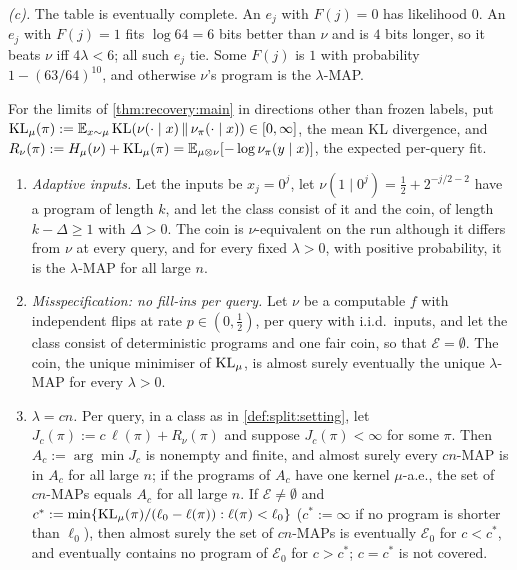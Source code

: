 \emph{(c).} The table is eventually complete. An $e_j$ with $F(j)=0$ has likelihood $0$. An $e_j$ with $F(j)=1$ fits $\log64=6$ bits better than $\nu$ and is $4$ bits longer, so it beats $\nu$ iff $4\lambda<6$; all such $e_j$ tie. Some $F(j)$ is $1$ with probability $1-(63/64)^{10}$, and otherwise $\nu$'s program is the $\lambda$-MAP.

For the limits of \cref{thm:recovery:main} in directions other than frozen labels, put $\operatorname{KL}_\mu(\pi):=\mathbb{E}_{x\sim\mu}\operatorname{KL}(\nu(\cdot\mid x)\,\Vert\,\nu_\pi(\cdot\mid x))\in[0,\infty]$, the mean KL divergence, and $R_\nu(\pi):=H_\mu(\nu)+\operatorname{KL}_\mu(\pi)=\mathbb{E}_{\mu\otimes\nu}[-\log\nu_\pi(y\mid x)]$, the expected per-query fit.

\begin{proposition}[Adaptive inputs, misspecification, $\lambda=cn$]\label{prop:recovery:beyond}
\begin{enumerate}[label=(\alph*),itemsep=1pt,topsep=2pt]
\item \emph{Adaptive inputs.} Let the inputs be $x_j=0^j$, let $\nu(1\mid0^j)=\frac12+2^{-j/2-2}$ have a program of length $k$, and let the class consist of it and the coin, of length $k-\Delta\ge1$ with $\Delta>0$. The coin is $\nu$-equivalent on the run although it differs from $\nu$ at every query, and for every fixed $\lambda>0$, with positive probability, it is the $\lambda$-MAP for all large $n$.
\item \emph{Misspecification: no fill-ins per query.} Let $\nu$ be a computable $f$ with independent flips at rate $p\in(0,\frac12)$, per query with i.i.d.\ inputs, and let the class consist of deterministic programs and one fair coin, so that $\mathcal E=\emptyset$. The coin, the unique minimiser of $\operatorname{KL}_\mu$, is almost surely eventually the unique $\lambda$-MAP for every $\lambda>0$.
\item \emph{$\lambda=cn$.} Per query, in a class as in \cref{def:split:setting}, let $J_c(\pi):=c\,\ell(\pi)+R_\nu(\pi)$ and suppose $J_c(\pi)<\infty$ for some $\pi$. Then $A_c:=\arg\min J_c$ is nonempty and finite, and almost surely every $cn$-MAP is in $A_c$ for all large $n$; if the programs of $A_c$ have one kernel $\mu$-a.e., the set of $cn$-MAPs equals $A_c$ for all large $n$. If $\mathcal E\ne\emptyset$ and $c^*:=\min\{\operatorname{KL}_\mu(\pi)/(\ell_0-\ell(\pi)):\ell(\pi)<\ell_0\}$ ($c^*:=\infty$ if no program is shorter than $\ell_0$), then almost surely the set of $cn$-MAPs is eventually $\mathcal E_0$ for $c<c^*$, and eventually contains no program of $\mathcal E_0$ for $c>c^*$; $c=c^*$ is not covered.
\end{enumerate}
\end{proposition}

